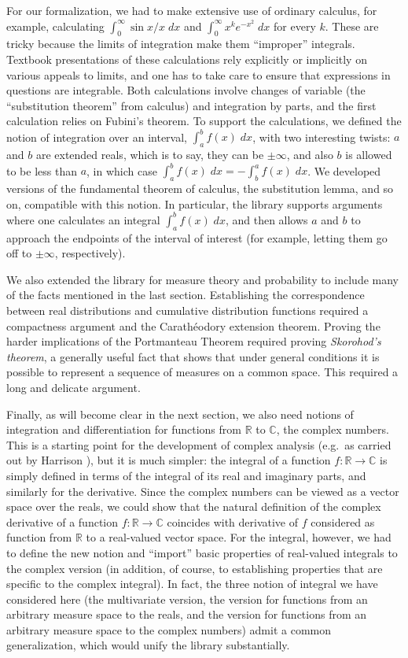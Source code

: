 \documentclass{article}
\newcommand{\RR}{\mathbb{R}}
\newcommand{\CC}{\mathbb{C}}
\begin{document}
For our formalization, we had to make extensive use of ordinary calculus, for example, calculating $\int_0^\infty \sin x / x \; dx$ and $\int_0^\infty x^k e^{-x^2} \; dx$ for every $k$. These are tricky because the limits of integration make them ``improper'' integrals. Textbook presentations of these calculations rely explicitly or implicitly on various appeals to limits, and one has to take care to ensure that expressions in questions are integrable. Both calculations involve changes of variable (the ``substitution theorem'' from calculus) and integration by parts, and the first calculation relies on Fubini's theorem. To support the calculations, we defined the notion of integration over an interval, $\int_a^b f(x) \; dx$, with two interesting twists: $a$ and $b$ are extended reals, which is to say, they can be $\pm \infty$, and also $b$ is allowed to be less than $a$, in which case $\int_a^b f(x) \; dx = - \int_b^a f(x) \; dx$. We developed versions of the fundamental theorem of calculus, the substitution lemma, and so on, compatible with this notion. In particular, the library supports arguments where one calculates an integral $\int_a^b f(x) \; dx$, and then allows $a$ and $b$ to approach the endpoints of the interval of interest (for example, letting them go off to $\pm \infty$, respectively).

We also extended the library for measure theory and probability to include many of the facts mentioned in the last section. Establishing the correspondence between real distributions and cumulative distribution functions 
required a compactness argument and the Carath\'eodory extension theorem. Proving the harder implications of the Portmanteau Theorem required proving \emph{Skorohod's theorem}, a generally useful fact that shows that under general conditions it is possible to represent a sequence of measures on a common space. This required a long and delicate argument.

Finally, as will become clear in the next section, we also need notions of integration and differentiation for functions from $\RR$ to $\CC$, the complex numbers. This is a starting point for the development of complex analysis (e.g.~as carried out by Harrison \cite{harrison:07}), but it is much simpler: the integral of a function $f : \RR \to \CC$ is simply defined in terms of the integral of its real and imaginary parts, and similarly for the derivative. Since the complex numbers can be viewed as a vector space over the reals, we could show that the natural definition of the complex derivative of a function $f : \RR \to \CC$ coincides with derivative of $f$ considered as function from $\RR$ to a real-valued vector space. For the integral, however, we had to define the new notion and ``import'' basic properties of real-valued integrals to the complex version (in addition, of course, to establishing properties that are specific to the complex integral). In fact, the three notion of integral we have considered here (the multivariate version, the version for functions from an arbitrary measure space to the reals, and the version for functions from an arbitrary measure space to the complex numbers) admit a common generalization, which would unify the library substantially. 
\end{document}
